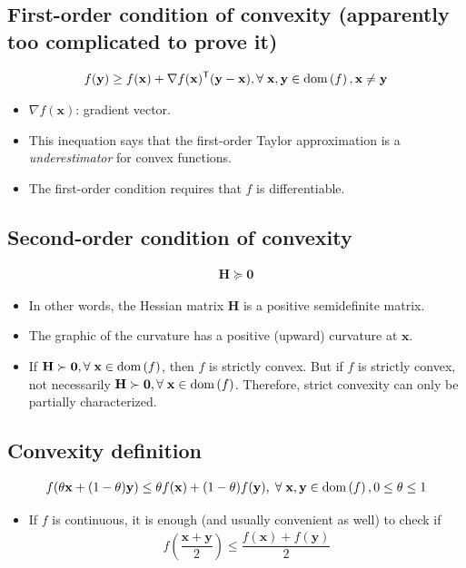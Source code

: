 \documentclass{article}
\newcommand{\dom}[1]{\ensuremath{\textnormal{dom}\left(#1\right)}} %
\begin{document}
\subsection{First-order condition of convexity (apparently too complicated to prove it)}
\begin{align}
	f(\mathbf{y}) \geq f(\mathbf{x}) + \nabla f (\mathbf{x})^\mathsf{T} (\mathbf{y} - \mathbf{x}),\forall\;\mathbf{x},\mathbf{y} \in \dom{f}, \mathbf{x}\neq\mathbf{y}
\end{align}
\begin{itemize}
	\item \(\nabla f (\mathbf{x})\): gradient vector.
	\item This inequation says that the first-order Taylor approximation is a \emph{underestimator} for convex functions.
	\item The first-order condition requires that \(f\) is differentiable.
\end{itemize}
\subsection{Second-order condition of convexity}
\begin{align}
	\mathbf{H}\succeq \mathbf{0}
\end{align}
\begin{itemize}
	\item In other words, the Hessian matrix \(\mathbf{H}\) is a positive semidefinite matrix.
	\item The graphic of the curvature has a positive (upward) curvature at \(\mathbf{x}\).
	\item If \(\mathbf{H}\succ\mathbf{0}, \forall\; \mathbf{x} \in \dom{f}\), then \(f\) is strictly convex. But if \(f\) is strictly convex, not necessarily \(\mathbf{H}\succ\mathbf{0},\forall\; \mathbf{x} \in \dom{f}\). Therefore, strict convexity can only be partially characterized.
\end{itemize}
\subsection{Convexity definition}
\begin{align}
	f(\theta\mathbf{x}+(1-\theta)\mathbf{y}) \leq \theta f(\mathbf{x}) + (1-\theta)f(\mathbf{y}),\;\forall\; \mathbf{x}, \mathbf{y} \in \dom{f}, 0\leq\theta\leq 1
\end{align}
\begin{itemize}
	\item If \(f\) is continuous, it is enough (and usually convenient as well) to check if
	      \begin{align}
		      f\left( \dfrac{\mathbf{x}+\mathbf{y}}{2} \right) \leq \dfrac{f(\mathbf{x}) + f(\mathbf{y})}{2}
	      \end{align}
\end{itemize}
\end{document}
